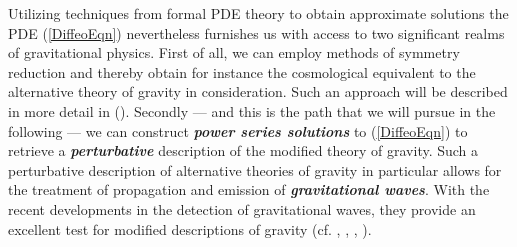 \documentclass[%
 reprint,
nofootinbib,
 amsmath,amssymb,
 aps,
 prd,
floatfix,
]{revtex4-2}
\begin{document}
Utilizing techniques from formal PDE theory to obtain approximate solutions the PDE (\ref{DiffeoEqn}) nevertheless furnishes us with access to two significant realms of gravitational physics. First of all, we can employ methods of symmetry reduction and thereby obtain for instance the cosmological equivalent to the alternative theory of gravity in consideration. Such an approach will be described in more detail in (\cite{NilsPHD}).
Secondly --- and this is the path that we will pursue in the following --- we can construct \textit{\textbf{power series solutions}} to (\ref{DiffeoEqn}) to retrieve a \textbf{\textit{perturbative}} description of the modified theory of gravity. Such a perturbative description of alternative theories of gravity in particular allows for the treatment of propagation and emission of \textit{\textbf{gravitational waves}}.
With the recent developments in the detection of gravitational waves, they provide an excellent test for modified descriptions of gravity (cf. \cite{2010PhRvD..81f4008Y}, \cite{2011PhRvD..83j4022B}, \cite{2017PhRvD..95j4027Z}, \cite{2013LRR....16....9Y} ).
\end{document}
